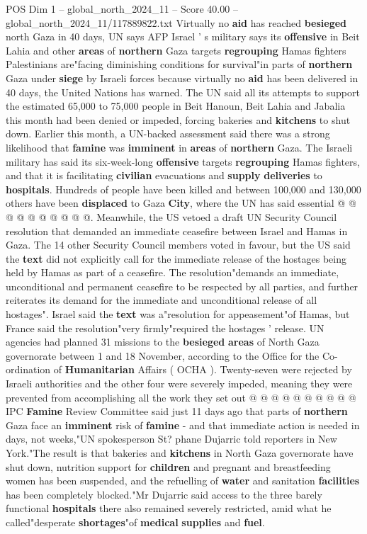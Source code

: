 \begin{textsample}{POS Dim 1 – global\_north\_2024\_11 – Score 40.00 – global\_north\_2024\_11/117889822.txt}  \label{ex:f1_pos_332}
Virtually no \textbf{aid} has reached \textbf{besieged} north Gaza in 40 days, UN says AFP Israel ' s military says its \textbf{offensive} in Beit Lahia and other \textbf{areas} of \textbf{northern} Gaza targets \textbf{regrouping} Hamas fighters Palestinians are"facing diminishing conditions for survival"in parts of \textbf{northern} Gaza under \textbf{siege} by Israeli forces because virtually no \textbf{aid} has been delivered in 40 days, the United Nations has warned.
The UN said all its attempts to support the estimated 65,000 to 75,000 people in Beit Hanoun, Beit Lahia and Jabalia this month had been denied or impeded, forcing bakeries and \textbf{kitchens} to shut down.
Earlier this month, a UN-backed assessment said there was a strong likelihood that \textbf{famine} was \textbf{imminent} in \textbf{areas} of \textbf{northern} Gaza.
The Israeli military has said its six-week-long \textbf{offensive} targets \textbf{regrouping} Hamas fighters, and that it is facilitating \textbf{civilian} evacuations and \textbf{supply} \textbf{deliveries} to \textbf{hospitals}.
Hundreds of people have been killed and between 100,000 and 130,000 others have been \textbf{displaced} to Gaza \textbf{City}, where the UN has said essential @ @ @ @ @ @ @ @ @ @.
Meanwhile, the US vetoed a draft UN Security Council resolution that demanded an immediate ceasefire between Israel and Hamas in Gaza.
The 14 other Security Council members voted in favour, but the US said the \textbf{text} did not explicitly call for the immediate release of the hostages being held by Hamas as part of a ceasefire.
The resolution"demands an immediate, unconditional and permanent ceasefire to be respected by all parties, and further reiterates its demand for the immediate and unconditional release of all hostages".
Israel said the \textbf{text} was a"resolution for appeasement"of Hamas, but France said the resolution"very firmly"required the hostages ' release.
UN agencies had planned 31 missions to the \textbf{besieged} \textbf{areas} of North Gaza governorate between 1 and 18 November, according to the Office for the Co-ordination of \textbf{Humanitarian} Affairs ( OCHA ).
Twenty-seven were rejected by Israeli authorities and the other four were severely impeded, meaning they were prevented from accomplishing all the work they set out @ @ @ @ @ @ @ @ @ @ IPC \textbf{Famine} Review Committee said just 11 days ago that parts of \textbf{northern} Gaza face an \textbf{imminent} risk of \textbf{famine} - and that immediate action is needed in days, not weeks,"UN spokesperson St? phane Dujarric told reporters in New York."The result is that bakeries and \textbf{kitchens} in North Gaza governorate have shut down, nutrition support for \textbf{children} and pregnant and breastfeeding women has been suspended, and the refuelling of \textbf{water} and sanitation \textbf{facilities} has been completely blocked."Mr Dujarric said access to the three barely functional \textbf{hospitals} there also remained severely restricted, amid what he called"desperate \textbf{shortages}"of \textbf{medical} \textbf{supplies} and \textbf{fuel}.

\end{textsample}
